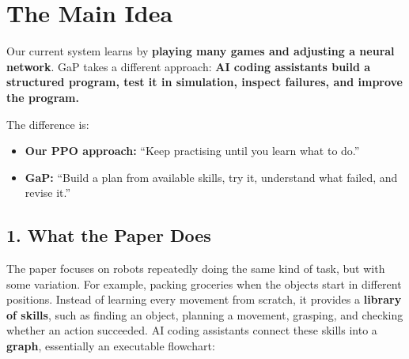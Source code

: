 \documentclass[11pt,a4paper]{article}
\begin{document}
\section*{The Main Idea}

Our current system learns by \textbf{playing many games and adjusting a neural network}. GaP takes a different approach:
\textbf{AI coding assistants build a structured program, test it in simulation,
inspect failures, and improve the program.}

\noindent The difference is:

\begin{itemize}
    \item \textbf{Our PPO approach:} ``Keep practising until you learn what to do.''
    \item \textbf{GaP:} ``Build a plan from available skills, try it, understand what failed, and revise it.''
\end{itemize}

\subsection*{1. What the Paper Does}

The paper focuses on robots repeatedly doing the same kind of task, but with some variation. For example, packing groceries when the objects start in different positions. Instead of learning every movement from scratch, it provides a \textbf{library of skills}, such as finding an object, planning a movement, grasping, and checking whether an action succeeded. AI coding assistants connect these skills into a \textbf{graph}, essentially an executable flowchart:
\end{document}
